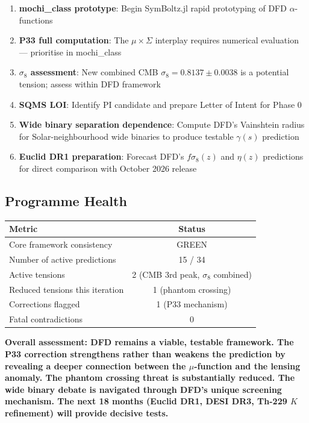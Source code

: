 \documentclass[11pt,a4paper]{article}
\begin{document}
\begin{enumerate}
\item \textbf{mochi\_class prototype}: Begin SymBoltz.jl rapid prototyping of DFD $\alpha$-functions
\item \textbf{P33 full computation}: The $\mu \times \Sigma$ interplay requires numerical evaluation --- prioritise in mochi\_class
\item \textbf{$\sigma_8$ assessment}: New combined CMB $\sigma_8 = 0.8137 \pm 0.0038$ is a potential tension; assess within DFD framework
\item \textbf{SQMS LOI}: Identify PI candidate and prepare Letter of Intent for Phase 0
\item \textbf{Wide binary separation dependence}: Compute DFD's Vainshtein radius for Solar-neighbourhood wide binaries to produce testable $\gamma(s)$ prediction
\item \textbf{Euclid DR1 preparation}: Forecast DFD's $f\sigma_8(z)$ and $\eta(z)$ predictions for direct comparison with October 2026 release
\end{enumerate}

\subsection{Programme Health}

\begin{center}
\begin{tabular}{lc}
\toprule
\textbf{Metric} & \textbf{Status} \\
\midrule
Core framework consistency & GREEN \\
Number of active predictions & 15 / 34 \\
Active tensions & 2 (CMB 3rd peak, $\sigma_8$ combined) \\
Reduced tensions this iteration & 1 (phantom crossing) \\
Corrections flagged & 1 (P33 mechanism) \\
Fatal contradictions & 0 \\
\bottomrule
\end{tabular}
\end{center}

\textbf{Overall assessment: DFD remains a viable, testable framework. The P33 correction strengthens rather than weakens the prediction by revealing a deeper connection between the $\mu$-function and the lensing anomaly. The phantom crossing threat is substantially reduced. The wide binary debate is navigated through DFD's unique screening mechanism. The next 18 months (Euclid DR1, DESI DR3, Th-229 $K$ refinement) will provide decisive tests.}
\end{document}
